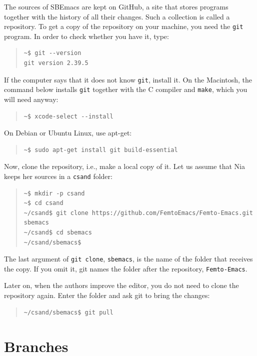 \documentclass[a4paper,12pt,openany]{book}
\begin{document}
The sources of SBEmacs are kept on GitHub, a site that stores
programs together with the history of all their changes.
Such a collection is called a repository. To get a copy of the
repository on your machine, you need the \verb|git| program.
In order to check whether you have it, type:
\begin{quote}
\begin{verbatim}
~$ git --version
git version 2.39.5
\end{verbatim}
\end{quote}
If the computer says that it does not know \verb|git|,
install it. On the Macintosh, the command below installs
\verb|git| together with the C compiler and \verb|make|,
which you will need anyway:
\begin{quote}
\begin{verbatim}
~$ xcode-select --install
\end{verbatim}
\end{quote}
On Debian or Ubuntu Linux, use apt-get:
\begin{quote}
\begin{verbatim}
~$ sudo apt-get install git build-essential
\end{verbatim}
\end{quote}

Now, clone the repository, i.e., make a local copy of it.
Let us assume that Nia keeps her sources in a \verb|csand|
folder:
\begin{quote}
\begin{verbatim}
~$ mkdir -p csand
~$ cd csand
~/csand$ git clone https://github.com/FemtoEmacs/Femto-Emacs.git sbemacs
~/csand$ cd sbemacs
~/csand/sbemacs$
\end{verbatim}
\end{quote}
The last argument of \verb|git clone|, \verb|sbemacs|, is the
name of the folder that receives the copy. If you omit it, git
names the folder after the repository, \verb|Femto-Emacs|.

Later on, when the authors improve the editor, you do not need
to clone the repository again. Enter the folder and ask git to
bring the changes:
\begin{quote}
\begin{verbatim}
~/csand/sbemacs$ git pull
\end{verbatim}
\end{quote}

\section{Branches}
\end{document}
